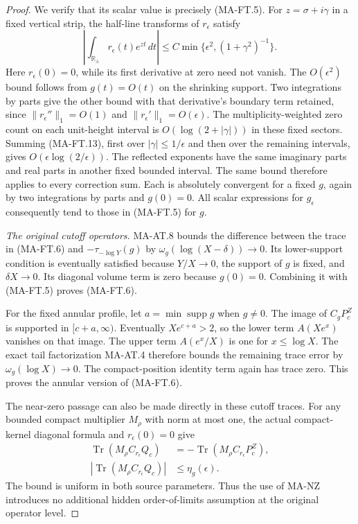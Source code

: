 \begin{proof}
We verify that its scalar value is precisely (MA-FT.5).
For $z=\sigma+i\gamma$ in a fixed vertical strip,
the half-line transforms of $r_\epsilon$ satisfy
\[
 \left|\int_{\mathbb R_\pm}
                r_\epsilon(t)e^{zt}\,dt\right|
       \le C\min\{\epsilon^2,(1+\gamma^2)^{-1}\}.
 \tag{MA-FT.13}
\]
Here $r_\epsilon(0)=0$, while its first derivative at zero
need not vanish.  The $O(\epsilon^2)$ bound follows from
$g(t)=O(t)$ on the shrinking support.  Two integrations
by parts give the other bound with that derivative's
boundary term retained, since
$\|r_\epsilon''\|_1=O(1)$ and
$\|r_\epsilon'\|_1=O(\epsilon)$.
The multiplicity-weighted zero count on each unit-height
interval is $O(\log(2+|\gamma|))$ in these fixed sectors.
Summing (MA-FT.13), first over $|\gamma|\le1/\epsilon$
and then over the remaining intervals, gives
$O(\epsilon\log(2/\epsilon))$.
The reflected exponents have the same imaginary parts
and real parts in another fixed bounded interval.
The same bound therefore applies to every correction
sum.  Each is absolutely convergent for a fixed $g$,
again by two integrations by parts and $g(0)=0$.
All scalar expressions for $g_\epsilon$ consequently
tend to those in (MA-FT.5) for $g$.

\emph{The original cutoff operators.}
MA-AT.8 bounds the difference between the trace in
(MA-FT.6) and $-\tau_{-\log Y}(g)$ by
$\omega_g(\log(X-\delta))\to0$.  Its lower-support
condition is eventually satisfied because $Y/X\to0$,
the support of $g$ is fixed, and $\delta X\to0$.
Its diagonal volume term is zero because $g(0)=0$.
Combining it with (MA-FT.5) proves (MA-FT.6).

For the fixed annular profile, let
$a=\min\operatorname{supp}g$ when $g\ne0$.
The image of $C_gP_c^Z$ is supported in $[c+a,\infty)$.
Eventually $Xe^{c+a}>2$, so the lower term $A(Xe^x)$
vanishes on that image.  The upper term $A(e^x/X)$
is one for $x\le\log X$.  The exact tail factorization
MA-AT.4 therefore bounds the remaining trace error
by $\omega_g(\log X)\to0$.
The compact-position identity term again has trace zero.
This proves the annular version of (MA-FT.6).

The near-zero passage can also be made directly in these
cutoff traces.  For any bounded compact multiplier $M_\rho$
with norm at most one, the actual compact-kernel diagonal
formula and $r_\epsilon(0)=0$ give
\[
 \begin{split}
 \operatorname{Tr}(M_\rho C_{r_\epsilon}Q_c)
     &=-\operatorname{Tr}(M_\rho C_{r_\epsilon}P_c^Z),\\
 |\operatorname{Tr}(M_\rho C_{r_\epsilon}Q_c)|
     &\le\eta_g(\epsilon).
 \end{split}
 \tag{MA-FT.14}
\]
The bound is uniform in both source parameters.  Thus
the use of MA-NZ introduces no additional hidden
order-of-limits assumption at the original operator level.


\end{proof}
